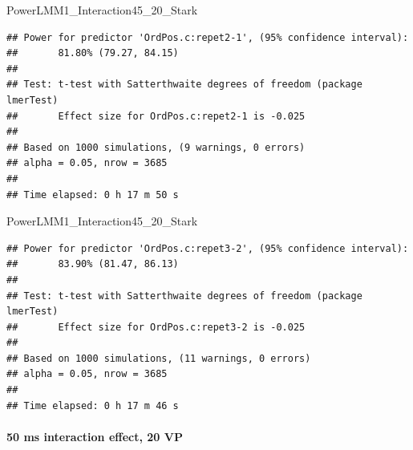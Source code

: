 \documentclass[
]{article}
\newenvironment{Shaded}{\begin{snugshade}}{\end{snugshade}}
\newcommand{\AttributeTok}[1]{\textcolor[rgb]{0.77,0.63,0.00}{#1}}
\newcommand{\CommentTok}[1]{\textcolor[rgb]{0.56,0.35,0.01}{\textit{#1}}}
\newcommand{\FunctionTok}[1]{\textcolor[rgb]{0.00,0.00,0.00}{#1}}
\newcommand{\NormalTok}[1]{#1}
\newcommand{\OtherTok}[1]{\textcolor[rgb]{0.56,0.35,0.01}{#1}}
\newcommand{\SpecialCharTok}[1]{\textcolor[rgb]{0.00,0.00,0.00}{#1}}
\newcommand{\StringTok}[1]{\textcolor[rgb]{0.31,0.60,0.02}{#1}}
\begin{document}
\begin{Shaded}
\begin{Highlighting}[]
\NormalTok{PowerLMM1\_Interaction45\_20\_Stark}
\end{Highlighting}
\end{Shaded}

\begin{verbatim}
## Power for predictor 'OrdPos.c:repet2-1', (95% confidence interval):
##       81.80% (79.27, 84.15)
## 
## Test: t-test with Satterthwaite degrees of freedom (package lmerTest)
##       Effect size for OrdPos.c:repet2-1 is -0.025
## 
## Based on 1000 simulations, (9 warnings, 0 errors)
## alpha = 0.05, nrow = 3685
## 
## Time elapsed: 0 h 17 m 50 s
\end{verbatim}

\begin{Shaded}
\end{Shaded}

\begin{Shaded}
\begin{Highlighting}[]
\NormalTok{PowerLMM1\_Interaction45\_20\_Stark}
\end{Highlighting}
\end{Shaded}

\begin{verbatim}
## Power for predictor 'OrdPos.c:repet3-2', (95% confidence interval):
##       83.90% (81.47, 86.13)
## 
## Test: t-test with Satterthwaite degrees of freedom (package lmerTest)
##       Effect size for OrdPos.c:repet3-2 is -0.025
## 
## Based on 1000 simulations, (11 warnings, 0 errors)
## alpha = 0.05, nrow = 3685
## 
## Time elapsed: 0 h 17 m 46 s
\end{verbatim}

\hypertarget{ms-interaction-effect-20-vp-2}{%
\paragraph{50 ms interaction effect, 20
VP}\label{ms-interaction-effect-20-vp-2}}
\end{document}

